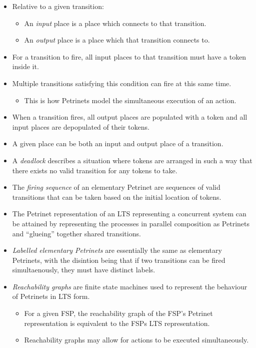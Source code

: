 \documentclass{article}
\begin{document}
\begin{itemize}
\begin{enumerate}
\begin{itemize}
			\item A petrinet can have multiple tokens simultaneously.
			\item The current position of tokens in the system is depicted by a dot in the place the token resides in.
		\end{itemize}
	\end{enumerate}
	\item Relative to a given transition:
	\begin{itemize}
		\item An \emph{input} place is a place which connects to that transition.
		\item An \emph{output} place is a place which that transition connects to.
	\end{itemize}
	\item For a transition to fire, all input places to that transition must have a token inside it.
	\item Multiple transitions satisfying this condition can fire at this same time.
	\begin{itemize}
		\item This is how Petrinets model the simultaneous execution of an action.
	\end{itemize}
	\item When a transition fires, all output places are populated with a token and all input places are depopulated of their tokens.
	\item A given place can be both an input and output place of a transition.
	\item A \emph{deadlock} describes a situation where tokens are arranged in such a way that there exists no valid transition for any tokens to take.
	\item The \emph{firing sequence} of an elementary Petrinet are sequences of valid transitions that can be taken based on the initial location of tokens.
	\item The Petrinet representation of an LTS representing a concurrent system can be attained by representing the processes in parallel composition as Petrinets and ``glueing'' together shared transitions.
	\item \emph{Labelled elementary Petrinets} are essentially the same as elementary Petrinets, with the disintion being that if two transitions can be fired simultaenously, they must have distinct labels.
	\item \emph{Reachability graphs} are finite state machines used to represent the behaviour of Petrinets in LTS form.
	\begin{itemize}
		\item For a given FSP, the reachability graph of the FSP's Petrinet representation is equivalent to the FSPs LTS representation.
		\item Reachability graphs may allow for actions to be executed simultaneously.
	\end{itemize}
\end{itemize}
\end{document}
